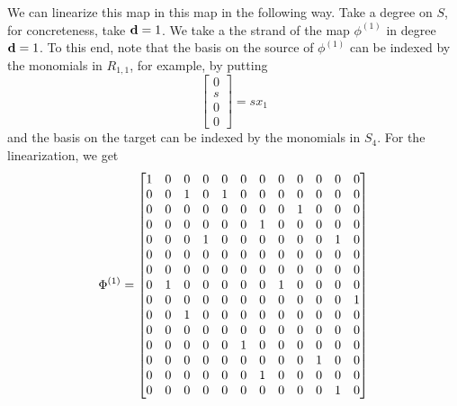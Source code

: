 \documentclass[fleqn,reqno]{amsart}
\begin{document}
\begin{example}[$\mt{ex202}$]
We can linearize this map in this map in the following way.
Take a degree on $S$, for concreteness, take $\mathbf d=1$.
We take a the strand of the map $\phi^{(1)}$ in degree $\mathbf d=1$.
To this end,
note that the basis on the source of $\phi^{(1)}$ can be indexed by the monomials in $R_{1,1}$,
for example, by putting
\[
	\begin{bmatrix}0\\s\\0\\0\end{bmatrix}=sx_1
\]
and the basis on the target can be indexed by the monomials in $S_4$.
For the linearization, we get
\[
	\Phi^{(1)}=
	\bgroup\makeatletter\c@MaxMatrixCols=12\makeatother\begin{bmatrix}1&
      0&
      0&
      0&
      0&
      0&
      0&
      0&
      0&
      0&
      0&
      0\\
      0&
      0&
      1&
      0&
      1&
      0&
      0&
      0&
      0&
      0&
      0&
      0\\
      0&
      0&
      0&
      0&
      0&
      0&
      0&
      0&
      1&
      0&
      0&
      0\\
      0&
      0&
      0&
      0&
      0&
      0&
      1&
      0&
      0&
      0&
      0&
      0\\
      0&
      0&
      0&
      1&
      0&
      0&
      0&
      0&
      0&
      0&
      1&
      0\\
      0&
      0&
      0&
      0&
      0&
      0&
      0&
      0&
      0&
      0&
      0&
      0\\
      0&
      0&
      0&
      0&
      0&
      0&
      0&
      0&
      0&
      0&
      0&
      0\\
      0&
      1&
      0&
      0&
      0&
      0&
      0&
      1&
      0&
      0&
      0&
      0\\
      0&
      0&
      0&
      0&
      0&
      0&
      0&
      0&
      0&
      0&
      0&
      1\\
      0&
      0&
      1&
      0&
      0&
      0&
      0&
      0&
      0&
      0&
      0&
      0\\
      0&
      0&
      0&
      0&
      0&
      0&
      0&
      0&
      0&
      0&
      0&
      0\\
      0&
      0&
      0&
      0&
      0&
      1&
      0&
      0&
      0&
      0&
      0&
      0\\
      0&
      0&
      0&
      0&
      0&
      0&
      0&
      0&
      0&
      1&
      0&
      0\\
      0&
      0&
      0&
      0&
      0&
      0&
      1&
      0&
      0&
      0&
      0&
      0\\
      0&
      0&
      0&
      0&
      0&
      0&
      0&
      0&
      0&
      0&
      1&
      0\\
      \end{bmatrix}\egroup
\]


\end{example}
\end{document}

